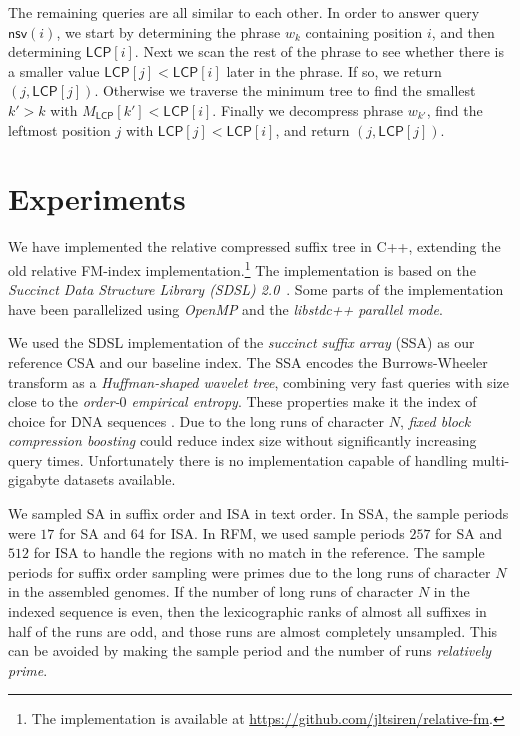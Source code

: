 \documentclass[a4paper,11pt]{llncs}
\newcommand{\SA}{\textsf{SA}}
\newcommand{\ISA}{\textsf{ISA}}
\newcommand{\CSA}{\textsf{CSA}}
\newcommand{\SSA}{\textsf{SSA}}
\newcommand{\RFM}{\textsf{RFM}}
\newcommand{\mLCP}{\ensuremath{\mathsf{LCP}}}
\newcommand{\mnsv}{\ensuremath{\mathsf{nsv}}}
\begin{document}
The remaining queries are all similar to each other. In order to answer query $\mnsv(i)$, we start by determining the phrase $w_{k}$ containing position $i$, and then determining $\mLCP[i]$. Next we scan the rest of the phrase to see whether there is a smaller value $\mLCP[j] < \mLCP[i]$ later in the phrase. If so, we return $(j,\mLCP[j])$. Otherwise we traverse the minimum tree to find the smallest $k' > k$ with $M_{\mLCP}[k'] < \mLCP[i]$. Finally we decompress phrase $w_{k'}$, find the leftmost position $j$ with $\mLCP[j] < \mLCP[i]$, and return $(j,\mLCP[j])$.


\section{Experiments}

We have implemented the relative compressed suffix tree in C++, extending the old relative FM-index implementation.\footnote{The implementation is available at \url{https://github.com/jltsiren/relative-fm}.} The implementation is based on the \emph{Succinct Data Structure Library (SDSL) 2.0}~\cite{Gog2014b}. Some parts of the implementation have been parallelized using \emph{OpenMP} and the \emph{libstdc++ parallel mode}.

We used the SDSL implementation of the \emph{succinct suffix array} (\SSA{}) \cite{Ferragina2007a,Maekinen2005} as our reference \CSA{} and our baseline index. The \SSA{} encodes the Burrows-Wheeler transform as a \emph{Huffman-shaped wavelet tree}, combining very fast queries with size close to the \emph{order\nobreakdash-$0$ empirical entropy}. These properties make it the index of choice for DNA sequences \cite{Ferragina2009a}. Due to the long runs of character $N$, \emph{fixed block compression boosting} \cite{Kaerkkaeinen2011} could reduce index size without significantly increasing query times. Unfortunately there is no implementation capable of handling multi-gigabyte datasets available.

We sampled \SA{} in suffix order and \ISA{} in text order. In \SSA, the sample periods were $17$ for \SA{} and $64$ for \ISA. In \RFM, we used sample periods $257$ for \SA{} and $512$ for \ISA{} to handle the regions with no match in the reference. The sample periods for suffix order sampling were primes due to the long runs of character $N$ in the assembled genomes. If the number of long runs of character $N$ in the indexed sequence is even, then the lexicographic ranks of almost all suffixes in half of the runs are odd, and those runs are almost completely unsampled. This can be avoided by making the sample period and the number of runs \emph{relatively prime}.
\end{document}
